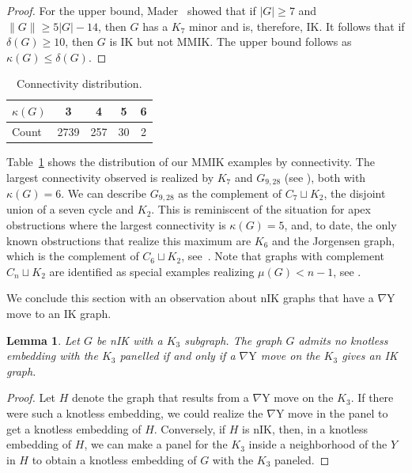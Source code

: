 \documentclass{amsart}
\newtheorem{lemma}[theorem]{Lemma}
\theoremstyle{remark}
\newcommand{\ty}{\nabla\mathrm{Y}}
\begin{document}
{\begin{proof}
For the upper bound, 
Mader~\cite{Md} showed that if $|G| \geq 7$ and $\|G \| \geq 5|G|-14$, then $G$ has a $K_7$ minor
and is, therefore, IK. It follows that if $\delta(G) \geq 10$, then $G$ is IK but not MMIK. The upper bound follows as
 $\kappa(G) \leq \delta(G)$.
 \end{proof}
 
\begin{table}[ht]
\begin{center}
\begin{tabular}{|l|c|c|c|c|} \hline
$\kappa(G)$ & 3 & 4 & 5 & 6 \\ \hline
Count & 2739 & 257 & 30 & 2 \\ \hline
\end{tabular}
\vspace*{.1in}
\caption{Connectivity distribution.} \label{tbl:conn}
\end{center}
\end{table}

Table~\ref{tbl:conn} shows the distribution of our MMIK examples by connectivity. 
The largest connectivity observed is realized by $K_7$ and
 $G_{9,28}$ (see \cite{GMN}), both with $\kappa(G) = 6$. We can describe $G_{9,28}$ as the complement
 of $C_7 \sqcup K_2$, the disjoint union of a seven cycle and $K_2$. This is reminiscent 
 of the situation for apex obstructions where the largest connectivity is $\kappa(G) = 5$, 
 and, to date, the only known obstructions that realize this maximum are $K_6$ and 
 the J\/orgensen graph, which is the complement of $C_6 \sqcup K_2$, see~\cite{PPP}. Note that graphs
 with complement $C_n \sqcup K_2$ are identified as special examples realizing
 $\mu(G) < n-1$, see \cite[Theorem 5.5 and Figure 4]{HLS}.
 
We conclude this section with an observation about nIK graphs that have a $\ty$ move to an IK graph.

\begin{lemma} Let $G$ be nIK with a $K_3$ subgraph.
The graph $G$ admits no knotless embedding with the $K_3$ panelled if and only if
a $\ty$ move on the $K_3$ gives an IK graph.
\end{lemma}

\begin{proof}
Let $H$ denote the graph that results from a $\ty$ move on the $K_3$.
If there were such a knotless embedding, we could realize the $\ty$ move in the panel to get a knotless
embedding of $H$. Conversely, if $H$ is nIK, then, in a knotless embedding of
$H$, we can make a panel for the $K_3$ inside a neighborhood of the $Y$ in $H$ to obtain a knotless
embedding of $G$ with the $K_3$ paneled.
\end{proof} 

}
\end{document}
